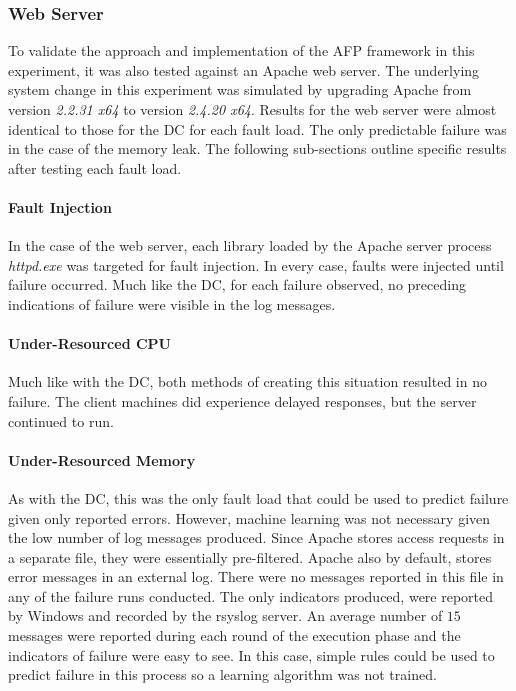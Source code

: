 \subsubsection{Web Server}
To validate the approach and implementation of the \ac{AFP} framework in this
experiment, it was also tested against an Apache web server.  The underlying
system change in this experiment was simulated by upgrading Apache from version
\emph{2.2.31 x64} to version \emph{2.4.20 x64}.  Results for the web server
were almost identical to those for the \ac{DC} for each fault load.  The only
predictable failure was in the case of the memory leak.  The following
sub-sections outline specific results after testing each fault load.

\paragraph{Fault Injection}
In the case of the web server, each library loaded by the Apache server process
\emph{httpd.exe} was targeted for fault injection.  In every case, faults were
injected until failure occurred.  Much like the \ac{DC}, for each failure
observed, no preceding indications of failure were visible in the log messages.

\paragraph{Under-Resourced CPU}
Much like with the \ac{DC}, both methods of creating this situation resulted in
no failure.  The client machines did experience delayed responses, but the
server continued to run.

\paragraph{Under-Resourced Memory}
As with the \ac{DC}, this was the only fault load that could be used to predict
failure given only reported errors.  However, machine learning was not
necessary given the low number of log messages produced.  Since Apache stores
access requests in a separate file, they were essentially pre-filtered.  Apache
also by default, stores error messages in an external log.  There were no
messages reported in this file in any of the failure runs conducted.  The only
indicators produced, were reported by Windows and recorded by the rsyslog
server.  An average number of $15$ messages were reported during each round of
the execution phase and the indicators of failure were easy to see.  In this
case, simple rules could be used to predict failure in this process so a
learning algorithm was not trained.  


